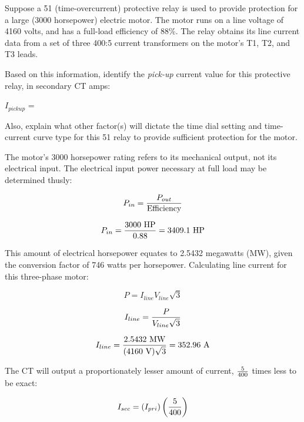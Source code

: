 

Suppose a 51 (time-overcurrent) protective relay is used to provide protection for a large (3000 horsepower) electric motor.  The motor runs on a line voltage of 4160 volts, and has a full-load efficiency of 88\%.  The relay obtains its line current data from a set of three 400:5 current transformers on the motor's T1, T2, and T3 leads.

\vskip 10pt

Based on this information, identify the {\it pick-up} current value for this protective relay, in secondary CT amps:

\vskip 10pt

$I_{pickup}$ = \underbar{\hskip 50pt}

\vskip 10pt

Also, explain what other factor(s) will dictate the time dial setting and time-current curve type for this 51 relay to provide sufficient protection for the motor.







The motor's 3000 horsepower rating refers to its mechanical output, not its electrical input.  The electrical input power necessary at full load may be determined thusly:

$$P_{in} = {P_{out} \over \hbox{Efficiency}}$$

$$P_{in} = {3000 \hbox{ HP} \over 0.88} = 3409.1 \hbox{ HP}$$

This amount of electrical horsepower equates to 2.5432 megawatts (MW), given the conversion factor of 746 watts per horsepower.  Calculating line current for this three-phase motor:

$$P = I_{line} V_{line} \sqrt{3}$$

$$I_{line} = {P \over V_{line} \sqrt{3}}$$

$$I_{line} = {2.5432 \hbox{ MW} \over (4160 \hbox{ V}) \sqrt{3}} = 352.96 \hbox{ A}$$

The CT will output a proportionately lesser amount of current, $5 \over 400$ times less to be exact:

$$I_{sec} = (I_{pri}) \left({5 \over 400}\right)$$

